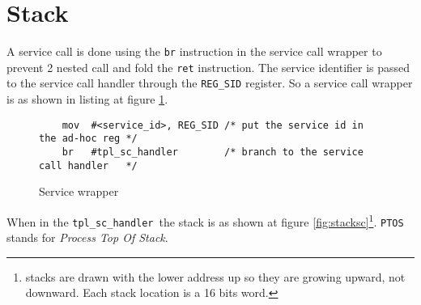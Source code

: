 \documentclass[11pt, oneside]{article}   	%
\newcommand{\sch}{\lstinline{tpl_sc_handler}}
\begin{document}

\section{Stack}

A service call is done using the \lstinline{br} instruction in the service call wrapper to prevent 2 nested call and fold the \lstinline{ret} instruction. The service identifier is passed to the service call handler through the \lstinline{REG_SID} register. So a service call wrapper is as shown in listing at figure \ref{lst:wrapper}.

\begin{figure}[h]
\caption{Service wrapper}
\begin{lstlisting}
    mov  #<service_id>, REG_SID /* put the service id in the ad-hoc reg */
    br   #tpl_sc_handler        /* branch to the service call handler   */
\end{lstlisting}
\label{lst:wrapper}
\end{figure}

When in the \sch\ the stack is as shown at figure \ref{fig:stacksc}\footnote{stacks are drawn with the lower address up so they are growing upward, not downward. Each stack location is a 16 bits word.}. \texttt{PTOS} stands for \emph{Process Top Of Stack}.
\end{document}
